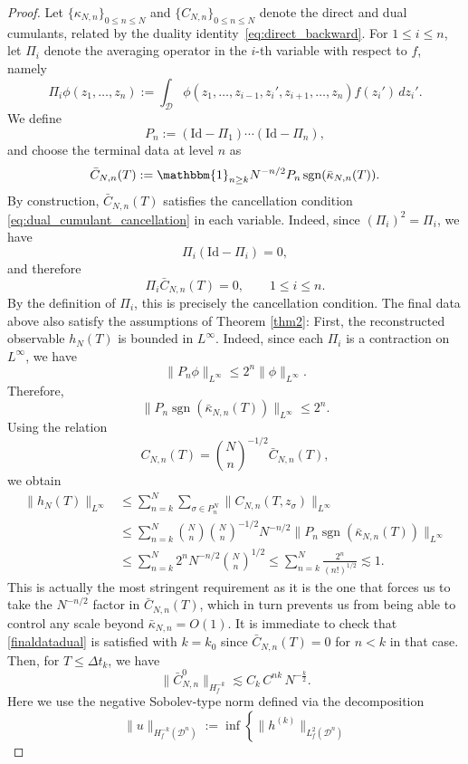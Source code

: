 \documentclass[pdflatex,sn-mathphys-num]{sn-jnl}
\theoremstyle{thmstyleone}%
\theoremstyle{thmstyletwo}%
\theoremstyle{thmstylethree}%
\begin{document}
\begin{proof}
Let \(\{\kappa_{N,n}\}_{0\le n\le N}\) and \(\{ C_{N,n}\}_{0\le n\le N}\) denote the
direct and dual cumulants, related by the duality identity~\eqref{eq:direct_backward}. For \(1\leq i\leq n\), let \(\Pi_i\) denote the averaging operator in the
\(i\)-th variable with respect to \(f\), namely
\[
\Pi_i\phi(z_1,\ldots,z_n)
:=
\int_{\mathcal D}
\phi(z_1,\ldots,z_{i-1},z_i',z_{i+1},\ldots,z_n)
f(z_i')\,dz_i' .
\]
We define
\[
P_n:=(\mathrm{Id}-\Pi_1)\cdots(\mathrm{Id}-\Pi_n),
\]
and choose the terminal data at level \(n\) as
\[
\bar{C}_{N,n}(T)
:=
\mathbbm{1}_{n \geq k}N^{-n/2}P_n\operatorname{sgn}(\bar\kappa_{N,n}(T)).
\]
By construction, \(\bar{C}_{N,n}(T)\) satisfies the cancellation condition \eqref{eq:dual_cumulant_cancellation} in
each variable. Indeed, since \((\Pi_i)^2=\Pi_i\), we have
\[
\Pi_i(\mathrm{Id}-\Pi_i)=0,
\]
and therefore
\[
\Pi_i\bar{C}_{N,n}(T)=0,
\qquad 1\leq i\leq n.
\]
By the definition of \(\Pi_i\), this is precisely the cancellation condition. The final data above also satisfy the assumptions of Theorem \ref{thm2}: First, the reconstructed observable \(h_N(T)\) is bounded in \(L^\infty\). Indeed, since each \(\Pi_i\) is a contraction on \(L^\infty\), we have
\[
\|P_n\phi\|_{L^\infty}\leq 2^n\|\phi\|_{L^\infty}.
\]
Therefore,
\[
\|P_n\operatorname{sgn}(\bar\kappa_{N,n}(T))\|_{L^\infty}\leq 2^n.
\]
Using the relation
\[
C_{N,n}(T)=\binom{N}{n}^{-1/2}\bar C_{N,n}(T),
\]
we obtain
\[
\begin{aligned}
\|h_N(T)\|_{L^\infty}
&\leq
\sum_{n=k}^N
\sum_{\sigma\in P_n^N}
\|C_{N,n}(T,z_\sigma)\|_{L^\infty}  \\
&\leq
\sum_{n=k}^N
\binom{N}{n}
\binom{N}{n}^{-1/2}
N^{-n/2}
\|P_n\operatorname{sgn}(\bar\kappa_{N,n}(T))\|_{L^\infty}  \\
&\leq
\sum_{n=k}^N
2^n N^{-n/2}\binom{N}{n}^{1/2}
\leq
\sum_{n=k}^N
\frac{2^n}{(n!)^{1/2}}
\lesssim 1 .
\end{aligned}
\]
This is actually the most stringent requirement as it is the one that forces us to take the $N^{-n/2}$ factor in $\bar C_{N,n}(T)$, which in turn prevents us from being able to control any scale beyond $\bar \kappa_{N,n}=O(1)$. It is immediate to check that \eqref{finaldatadual} is satisfied with $k=k_0$ since $\bar C_{N,n}(T)=0$ for $n<k$ in that case. Then, for $T \leq \Delta t_k$, we have
\[
\|\bar C_{N,n}^0\|_{H^{-k}_{f}} \lesssim C_k\,C^{nk}\,N^{-\frac{k}{2}}.
\]
Here we use the negative Sobolev-type norm defined via the decomposition
\[
\|u\|_{H^{-k}_f(\mathcal{D}^{n})} := \inf \left\{ \|h^{(k)}\|_{L^2_f(\mathcal{D}^n)} 
\]
\end{proof}
\end{document}
